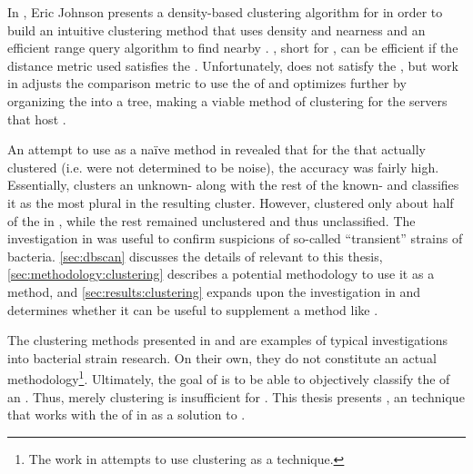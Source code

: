 In \cite{johnson2015density}, Eric Johnson presents a density-based clustering algorithm for \pyros{} in order to build an intuitive clustering method that uses density and nearness and an efficient range query algorithm to find nearby \isols{}.
\dbscan{} \cite{ester1996density}, short for \dbscanlong{}, can be efficient if the distance metric used satisfies the \trieq{}.
Unfortunately, \pearson{} does not satisfy the \trieq{}, but work in \cite{johnson2015density} adjusts the comparison metric to use the \euclid{} of \zscores{} and optimizes further by organizing the \pyros{} into a tree, making \dbscan{} a viable method of clustering for the servers that host \cplop{}.

An attempt to use \cite{johnson2015density} as a na{\"i}ve \mst{} method in \cite{DBLP:conf/bcb/McGovernJDBKV16} revealed that for the \isols{} that actually clustered (i.e. were not determined to be noise), the accuracy was fairly high.
Essentially, \cite{DBLP:conf/bcb/McGovernJDBKV16} clusters an unknown-\spec{} \isol{} along with the rest of the known-\spec{} \isols{} \cplop{} and classifies it as the most plural \spec{} in the resulting cluster.
However, \cite{johnson2015density} clustered only about half of the \isols{} in \cplop{}, while the rest remained unclustered and thus unclassified.
The investigation in \cite{DBLP:conf/bcb/McGovernJDBKV16} was useful to confirm suspicions of so-called ``transient'' strains of \ecoli{} bacteria.
\autoref{sec:dbscan} discusses the details of \cite{johnson2015density} relevant to this thesis, \autoref{sec:methodology:clustering} describes a potential methodology to use it as a \mst{} method, and \autoref{sec:results:clustering} expands upon the investigation in \cite{DBLP:conf/bcb/McGovernJDBKV16} and determines whether it can be useful to supplement a \mst{} method like \krap{}.

The clustering methods presented in \cite{DBLP:conf/bibm/MontanaDNBK11, montana2012investigating, SolimanDVMBNWKG12, montana2013ontological, montana2013algorithms} and \cite{johnson2015density} are examples of typical investigations into bacterial strain research.
On their own, they do not constitute an actual \mst{} methodology\footnote{The work in \cite{DBLP:conf/bcb/McGovernJDBKV16} attempts to use clustering as a \mst{} technique.}.
Ultimately, the goal of \cplop{} is to be able to objectively classify the \spec{} of an \ecoli{} \isol{}.
Thus, merely clustering \isols{} is insufficient for \mst{}.
This thesis presents \krap{}, an \mst{} technique that works with the \pyros{} of \isols{} in \cplop{} as a solution to \mst{}.

